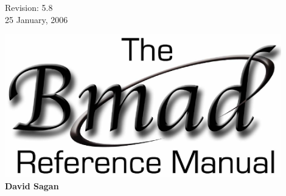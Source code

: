 \thispagestyle{empty}

\begin{flushright}
\large
  Revision: 5.8 \\
  25 January, 2006 \\
\end{flushright}

\vfill

{
\begin{center}
\includegraphics[width=12cm]{bmad_ref_manual.eps} \\
\vskip 0.3in
\huge\bf David Sagan
\end{center}
}

\vfill
\break
